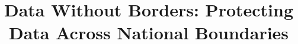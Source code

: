 \documentclass[twocolumn,10pt]{confpaper}
\begin{document}
\date{}

\title{\Large \bf Data Without Borders: Protecting Data Across National Boundaries}


\maketitle

\thispagestyle{empty}






%



{\footnotesize 
\balance }
\end{document}
